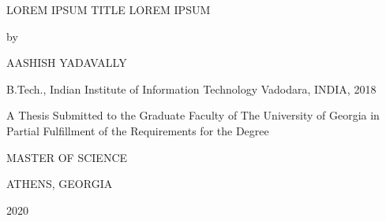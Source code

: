 \thispagestyle{empty}

\begin{center}
    LOREM IPSUM TITLE LOREM IPSUM
    
    \vspace*{2\baselineskip}
    by

    \vspace*{2\baselineskip}
    AASHISH YADAVALLY
    
    B.Tech., Indian Institute of Information Technology Vadodara, INDIA, 2018
    \vspace*{4\baselineskip}

    A Thesis Submitted to the Graduate Faculty of The University of Georgia
    in Partial Fulfillment of the Requirements for the Degree
    \vspace*{3\baselineskip}

    MASTER OF SCIENCE
    \vspace*{3\baselineskip}

    ATHENS, GEORGIA
    
    2020
\end{center}

\newpage